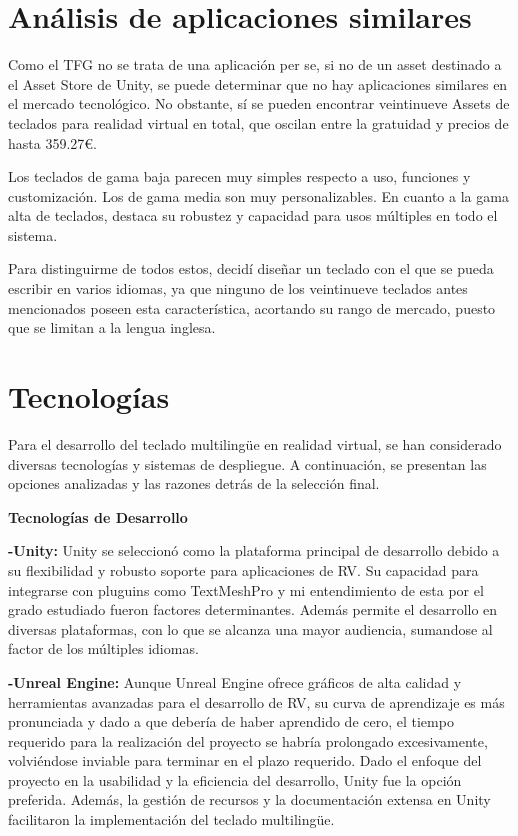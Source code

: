 
\section{Análisis de aplicaciones similares}
Como el TFG no se trata de una aplicación per se, si no de un asset destinado a el Asset Store de Unity, se puede determinar que no hay aplicaciones similares en el mercado tecnológico. No obstante, sí se pueden encontrar veintinueve Assets de teclados para realidad virtual en total, que oscilan entre la gratuidad y precios de hasta 359.27€. 

Los teclados de gama baja parecen muy simples respecto a uso, funciones y customización. Los de gama media son muy personalizables. En cuanto a la gama alta de teclados, destaca su robustez y capacidad para usos múltiples en todo el sistema. 

Para distinguirme de todos estos, decidí diseñar un teclado con el que se pueda escribir en varios idiomas, ya que ninguno de los veintinueve teclados antes mencionados poseen esta característica, acortando su rango de mercado, puesto que se limitan a la lengua inglesa.

\section{Tecnologías}
Para el desarrollo del teclado multilingüe en realidad virtual, se han considerado diversas tecnologías y sistemas de despliegue. A continuación, se presentan las opciones analizadas y las razones detrás de la selección final.

\textbf{Tecnologías de Desarrollo}

\textbf{-Unity:} Unity se seleccionó como la plataforma principal de desarrollo debido a su flexibilidad y robusto soporte para aplicaciones de RV. Su capacidad para integrarse con pluguins como TextMeshPro y mi entendimiento de esta por el grado estudiado fueron factores determinantes. Además permite el desarrollo en diversas plataformas, con lo que se alcanza una mayor audiencia, sumandose al factor de los múltiples idiomas.

\textbf{-Unreal Engine:} Aunque Unreal Engine ofrece gráficos de alta calidad y herramientas avanzadas para el desarrollo de RV, su curva de aprendizaje es más pronunciada y dado a que debería de haber aprendido de cero, el tiempo requerido para la realización del proyecto se habría prolongado excesivamente, volviéndose inviable para terminar en el plazo requerido. Dado el enfoque del proyecto en la usabilidad y la eficiencia del desarrollo, Unity fue la opción preferida. Además, la gestión de recursos y la documentación extensa en Unity facilitaron la implementación del teclado multilingüe.

